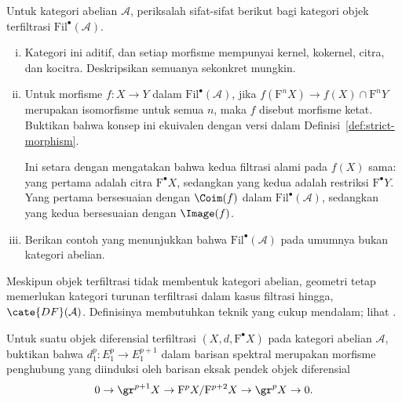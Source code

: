 
\begin{Exercises}
	\item Untuk kategori abelian $\mathcal{A}$, periksalah sifat-sifat
	berikut bagi kategori objek terfiltrasi $\mathrm{Fil}^\bullet(\mathcal{A})$.
	\begin{enumerate}[(i)]
		\item Kategori ini aditif, dan setiap morfisme mempunyai kernel,
		kokernel, citra, dan kocitra. Deskripsikan semuanya sekonkret mungkin.
		\item Untuk morfisme $f:X\to Y$ dalam
		$\mathrm{Fil}^\bullet(\mathcal{A})$, jika
		$f(\mathrm{F}^nX)\to f(X)\cap\mathrm{F}^nY$ merupakan isomorfisme
		untuk semua $n$, maka $f$ disebut morfisme ketat. Buktikan bahwa konsep
		ini ekuivalen dengan versi dalam Definisi~\ref{def:strict-morphism}.

		\begin{hint}
			Ini setara dengan mengatakan bahwa kedua filtrasi alami pada $f(X)$
			sama: yang pertama adalah citra $\mathrm{F}^\bullet X$, sedangkan
			yang kedua adalah restriksi $\mathrm{F}^\bullet Y$. Yang pertama
			bersesuaian dengan $\Coim(f)$ dalam
			$\mathrm{Fil}^\bullet(\mathcal{A})$, sedangkan yang kedua
			bersesuaian dengan $\Image(f)$.
		\end{hint}
		\item Berikan contoh yang menunjukkan bahwa
		$\mathrm{Fil}^\bullet(\mathcal{A})$ pada umumnya bukan kategori abelian.
	\end{enumerate}
	Meskipun objek terfiltrasi tidak membentuk kategori abelian, geometri tetap
	memerlukan kategori turunan terfiltrasi dalam kasus filtrasi hingga,
	$\cate{DF}(\mathcal{A})$. Definisinya membutuhkan teknik yang cukup
	mendalam; lihat \cite[Tag 05RX]{stacks}.

	\item Untuk suatu objek diferensial terfiltrasi
	$(X,d,\mathrm{F}^\bullet X)$ pada kategori abelian $\mathcal{A}$,
	buktikan bahwa $d_1^p:E_1^p\to E_1^{p+1}$ dalam barisan spektral merupakan
	morfisme penghubung yang diinduksi oleh barisan eksak pendek objek
	diferensial
	\[ 0\to\gr^{p+1}X\to\mathrm{F}^pX/\mathrm{F}^{p+2}X
	\to\gr^pX\to0. \]


\end{Exercises}
